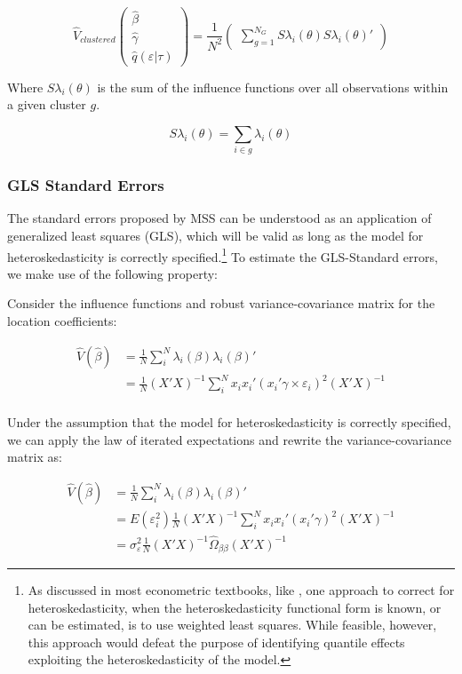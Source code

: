 \documentclass[
  authoryear,
  preprint,
  1p]{elsarticle}
\begin{document}
\[\hat{V}_{clustered}
  \begin{pmatrix}
  \hat\beta \\
  \hat\gamma \\
  \hat q(\varepsilon|\tau)
  \end{pmatrix}
 = \frac{1}{N^2} 
 \begin{pmatrix}
 \sum_{g=1}^{N_G} S\lambda_i(\theta) S\lambda_i(\theta)'
  \end{pmatrix}
\]

Where \(S\lambda_i(\theta)\) is the sum of the influence functions over
all observations within a given cluster \(g\).

\[S\lambda_i(\theta) = \sum_{i\in g} \lambda_i(\theta)
\]

\hypertarget{gls-standard-errors}{%
\subsubsection{GLS Standard Errors}\label{gls-standard-errors}}

The standard errors proposed by MSS can be understood as an application
of generalized least squares (GLS), which will be valid as long as the
model for heteroskedasticity is correctly specified.\footnote{As
  discussed in most econometric textbooks, like \citet{cameron2005}, one
  approach to correct for heteroskedasticity, when the
  heteroskedasticity functional form is known, or can be estimated, is
  to use weighted least squares. While feasible, however, this approach
  would defeat the purpose of identifying quantile effects exploiting
  the heteroskedasticity of the model.} To estimate the GLS-Standard
errors, we make use of the following property:

Consider the influence functions and robust variance-covariance matrix
for the location coefficients:

\[\begin{aligned}
\hat V(\hat \beta) &= \frac{1}{N} \sum_i^N \lambda_{i}(\beta) \lambda_{i}(\beta)' \\
&= \frac{1}{N}  (X'X)^{-1}  \sum_i^N x_i x_i' ( x_i'\gamma \times \varepsilon_i)^2 (X'X)^{-1} \\
\end{aligned}
\]

Under the assumption that the model for heteroskedasticity is correctly
specified, we can apply the law of iterated expectations and rewrite the
variance-covariance matrix as:

\[\begin{aligned}
\hat V(\hat \beta) &= \frac{1}{N} \sum_i^N \lambda_{i}(\beta) \lambda_{i}(\beta)' \\
&= E(\varepsilon_i^2) \frac{1}{N}  (X'X)^{-1}  \sum_i^N x_i x_i' ( x_i'\gamma)^2 (X'X)^{-1} \\
&= \sigma^2_{\varepsilon} \frac{1}{N}  (X'X)^{-1}  \hat\Omega_{\beta\beta} (X'X)^{-1}  
\end{aligned}
\]
\end{document}

